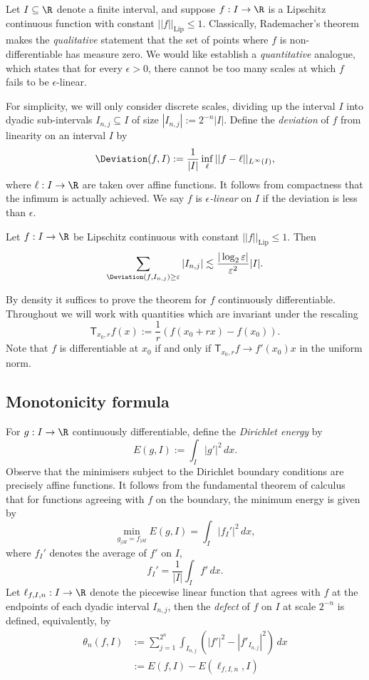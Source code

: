 Let $I \subseteq \R$ denote a finite interval, and suppose $f : I \to \R$ is a Lipschitz continuous function with constant $||f||_{\text{Lip}} \leq 1$. Classically, Rademacher's theorem makes the \textit{qualitative} statement that the set of points where $f$ is non-differentiable has measure zero. We would like establish a \textit{quantitative} analogue, which states that for every $\epsilon > 0$, there cannot be too many scales at which $f$ fails to be $\epsilon$-linear.

For simplicity, we will only consider discrete scales, dividing up the interval $I$ into dyadic sub-intervals $I_{n, j} \subseteq I$ of size $|I_{n,j}| := 2^{-n} |I|$. Define the \emph{deviation} of $f$ from linearity on an interval $I$ by 
	\[ \Deviation (f, I) := \frac{1}{|I|} \inf_\ell ||f - \ell||_{L^\infty (I)}, \]
where $\ell: I \to \R$ are taken over affine functions. It follows from compactness that the infimum is actually achieved. We say $f$ is \emph{$\epsilon$-linear} on $I$ if the deviation is less than $\epsilon$. 

\begin{theorem}
	Let $f: I \to \R$ be Lipschitz continuous with constant $||f||_{\mathrm{Lip}} \leq 1$. Then 
		\[ \sum_{\Deviation (f, I_{n, j}) \geq \epsilon} |I_{n, j}| \lesssim  \frac{|\log_2 \epsilon|}{\epsilon^2} |I|. \]
\end{theorem}

\begin{remark}
	By density it suffices to prove the theorem for $f$ continuously differentiable. Throughout we will work with quantities which are invariant under the rescaling
		\[ \mathsf T_{x_0, r} f (x) := \frac1r (f(x_0 + rx) - f(x_0)). \]
	Note that $f$ is differentiable at $x_0$ if and only if $\mathsf T_{x_0, r} f \to f'(x_0) x$ in the uniform norm.  
\end{remark}


\subsection{Monotonicity formula}

For $g: I \to \R$ continuously differentiable, define the \emph{Dirichlet energy} by 
	\[ E(g, I) := \int_I |g'|^2 \, dx. \]
Observe that the minimisers subject to the Dirichlet boundary conditions are precisely affine functions. It follows from the fundamental theorem of calculus that for functions agreeing with $f$ on the boundary, the minimum energy is given by  
	\[ \min_{g_{|\partial I} = f_{|\partial I}} E(g, I) = \int_I |f_I'|^2 \, dx ,\]
where $f_I'$ denotes the average of $f'$ on $I$,
	\[ f_I' = \frac{1}{|I|} \int_I f' \, dx. \]
Let $\ell_{f, I, n} : I \to \R$ denote the piecewise linear function that agrees with $f$ at the endpoints of each dyadic interval $I_{n, j}$, then the \emph{defect} of $f$ on $I$ at scale $2^{-n}$ is defined, equivalently, by 
	\begin{align*}
		\theta_n (f, I)
			&:= \sum_{j = 1}^{2^n} \int_{I_{n, j}} (|f'|^2 - |f'_{I_{n, j}}|^2) \, dx \\
			&:= E(f, I) - E(\ell_{f, I, n}, I)
	\end{align*}	

